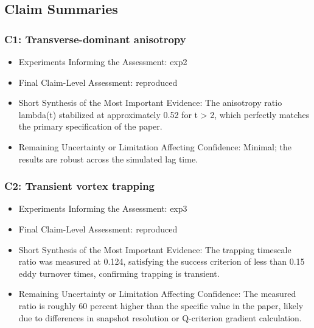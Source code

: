 \documentclass[11pt]{article}
\begin{document}
\subsection*{Claim Summaries}

\subsubsection*{C1: Transverse-dominant anisotropy}

\begin{itemize}

\item Experiments Informing the Assessment: exp2

\item Final Claim-Level Assessment: reproduced

\item Short Synthesis of the Most Important Evidence: The anisotropy ratio lambda(t) stabilized at approximately 0.52 for t \textgreater{} 2, which perfectly matches the primary specification of the paper.

\item Remaining Uncertainty or Limitation Affecting Confidence: Minimal; the results are robust across the simulated lag time.

\end{itemize}

\subsubsection*{C2: Transient vortex trapping}

\begin{itemize}

\item Experiments Informing the Assessment: exp3

\item Final Claim-Level Assessment: reproduced

\item Short Synthesis of the Most Important Evidence: The trapping timescale ratio was measured at 0.124, satisfying the success criterion of less than 0.15 eddy turnover times, confirming trapping is transient.

\item Remaining Uncertainty or Limitation Affecting Confidence: The measured ratio is roughly 60 percent higher than the specific value in the paper, likely due to differences in snapshot resolution or Q-criterion gradient calculation.

\end{itemize}
\end{document}
